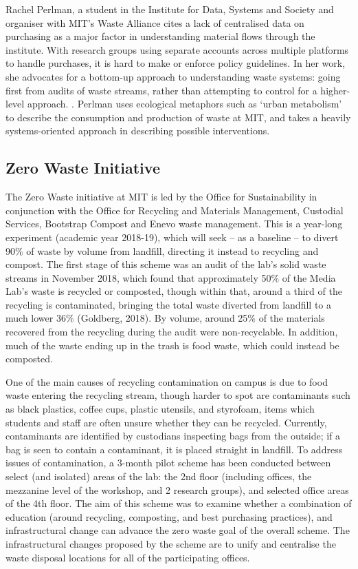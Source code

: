 \documentclass[nofonts,nols,justified,nobib]{tufte-book}
\begin{document}

Rachel Perlman, a student in the Institute for Data, Systems and Society and organiser with MIT's Waste Alliance cites a lack of centralised data on purchasing as a major factor in understanding material flows through the institute. With research groups using separate accounts across multiple platforms to handle purchases, it is hard to make or enforce policy guidelines. In her work, she advocates for a bottom-up approach to understanding waste systems: going first from audits of waste streams, rather than attempting to control for a higher-level approach. \cite{perlman_material_2016}. Perlman uses ecological metaphors such as `urban metabolism' to describe the consumption and production of waste at MIT, and takes a heavily systems-oriented approach in describing possible interventions.


\subsection*{Zero Waste Initiative}

The Zero Waste initiative at MIT is led by the Office for Sustainability in conjunction with the Office for Recycling and Materials Management, Custodial Services, Bootstrap Compost and Enevo waste management. This is a year-long experiment (academic year 2018-19), which will seek -- as a baseline -- to divert 90\% of waste by volume from landfill, directing it instead to recycling and compost. The first stage of this scheme was an audit of the lab's solid waste streams in November 2018, which found that approximately 50\% of the Media Lab's waste is recycled or composted, though within that, around a third of the recycling is contaminated, bringing the total waste diverted from landfill to a much lower 36\% (Goldberg, 2018). By volume, around 25\% of the materials recovered from the recycling during the audit were non-recyclable. In addition, much of the waste ending up in the trash is food waste, which could instead be composted.

One of the main causes of recycling contamination on campus is due to food waste entering the recycling stream, though harder to spot are contaminants such as black plastics, coffee cups, plastic utensils, and styrofoam, items which students and staff are often unsure whether they can be recycled. Currently, contaminants are identified by custodians inspecting bags from the outside; if a bag is seen to contain a contaminant, it is placed straight in landfill.
To address issues of contamination, a 3-month pilot scheme has been conducted between select (and isolated) areas of the lab: the 2nd floor (including offices, the mezzanine level of the workshop, and 2 research groups), and selected office areas of the 4th floor. The aim of this scheme was to examine whether a combination of education (around recycling, composting, and best purchasing practices), and infrastructural change can advance the zero waste goal of the overall scheme. The infrastructural changes proposed by the scheme are to unify and centralise the waste disposal locations for all of the participating offices. 
\end{document}
